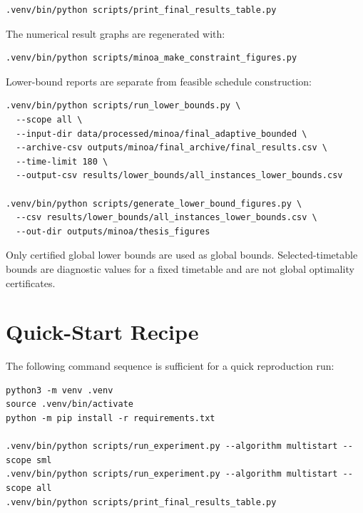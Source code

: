 \begin{lstlisting}[basicstyle=\ttfamily\scriptsize,breaklines=true,aboveskip=4pt,belowskip=4pt]
.venv/bin/python scripts/print_final_results_table.py
\end{lstlisting}

The numerical result graphs are regenerated with:

\begin{lstlisting}[basicstyle=\ttfamily\scriptsize,breaklines=true,aboveskip=4pt,belowskip=4pt]
.venv/bin/python scripts/minoa_make_constraint_figures.py
\end{lstlisting}

Lower-bound reports are separate from feasible schedule construction:

\begin{lstlisting}[basicstyle=\ttfamily\scriptsize,breaklines=true,aboveskip=4pt,belowskip=4pt]
.venv/bin/python scripts/run_lower_bounds.py \
  --scope all \
  --input-dir data/processed/minoa/final_adaptive_bounded \
  --archive-csv outputs/minoa/final_archive/final_results.csv \
  --time-limit 180 \
  --output-csv results/lower_bounds/all_instances_lower_bounds.csv

.venv/bin/python scripts/generate_lower_bound_figures.py \
  --csv results/lower_bounds/all_instances_lower_bounds.csv \
  --out-dir outputs/minoa/thesis_figures
\end{lstlisting}

Only certified global lower bounds are used as global bounds. Selected-timetable
bounds are diagnostic values for a fixed timetable and are not global optimality
certificates.

\section{Quick-Start Recipe}

The following command sequence is sufficient for a quick reproduction run:

\begin{lstlisting}[basicstyle=\ttfamily\scriptsize,breaklines=true,aboveskip=4pt,belowskip=4pt]
python3 -m venv .venv
source .venv/bin/activate
python -m pip install -r requirements.txt

.venv/bin/python scripts/run_experiment.py --algorithm multistart --scope sml
.venv/bin/python scripts/run_experiment.py --algorithm multistart --scope all
.venv/bin/python scripts/print_final_results_table.py
\end{lstlisting}

